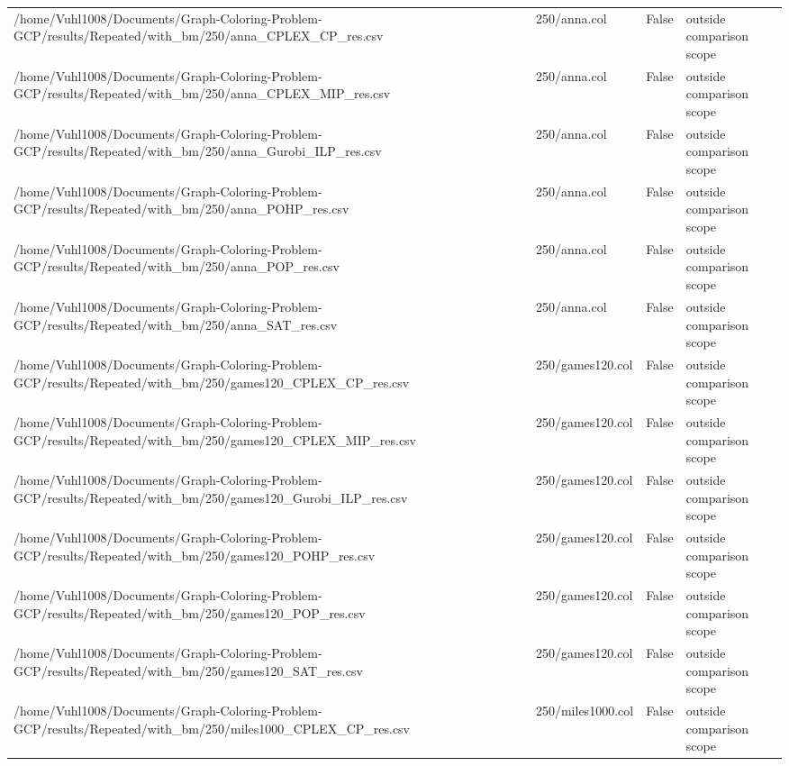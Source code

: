 \begin{table}[htbp]
\begin{tabular}{llll}
/home/Vuhl1008/Documents/Graph-Coloring-Problem-GCP/results/Repeated/with\_bm/250/anna\_CPLEX\_CP\_res.csv & 250/anna.col & False & outside comparison scope \\
/home/Vuhl1008/Documents/Graph-Coloring-Problem-GCP/results/Repeated/with\_bm/250/anna\_CPLEX\_MIP\_res.csv & 250/anna.col & False & outside comparison scope \\
/home/Vuhl1008/Documents/Graph-Coloring-Problem-GCP/results/Repeated/with\_bm/250/anna\_Gurobi\_ILP\_res.csv & 250/anna.col & False & outside comparison scope \\
/home/Vuhl1008/Documents/Graph-Coloring-Problem-GCP/results/Repeated/with\_bm/250/anna\_POHP\_res.csv & 250/anna.col & False & outside comparison scope \\
/home/Vuhl1008/Documents/Graph-Coloring-Problem-GCP/results/Repeated/with\_bm/250/anna\_POP\_res.csv & 250/anna.col & False & outside comparison scope \\
/home/Vuhl1008/Documents/Graph-Coloring-Problem-GCP/results/Repeated/with\_bm/250/anna\_SAT\_res.csv & 250/anna.col & False & outside comparison scope \\
/home/Vuhl1008/Documents/Graph-Coloring-Problem-GCP/results/Repeated/with\_bm/250/games120\_CPLEX\_CP\_res.csv & 250/games120.col & False & outside comparison scope \\
/home/Vuhl1008/Documents/Graph-Coloring-Problem-GCP/results/Repeated/with\_bm/250/games120\_CPLEX\_MIP\_res.csv & 250/games120.col & False & outside comparison scope \\
/home/Vuhl1008/Documents/Graph-Coloring-Problem-GCP/results/Repeated/with\_bm/250/games120\_Gurobi\_ILP\_res.csv & 250/games120.col & False & outside comparison scope \\
/home/Vuhl1008/Documents/Graph-Coloring-Problem-GCP/results/Repeated/with\_bm/250/games120\_POHP\_res.csv & 250/games120.col & False & outside comparison scope \\
/home/Vuhl1008/Documents/Graph-Coloring-Problem-GCP/results/Repeated/with\_bm/250/games120\_POP\_res.csv & 250/games120.col & False & outside comparison scope \\
/home/Vuhl1008/Documents/Graph-Coloring-Problem-GCP/results/Repeated/with\_bm/250/games120\_SAT\_res.csv & 250/games120.col & False & outside comparison scope \\
/home/Vuhl1008/Documents/Graph-Coloring-Problem-GCP/results/Repeated/with\_bm/250/miles1000\_CPLEX\_CP\_res.csv & 250/miles1000.col & False & outside comparison scope \\

\end{tabular}
\end{table}
